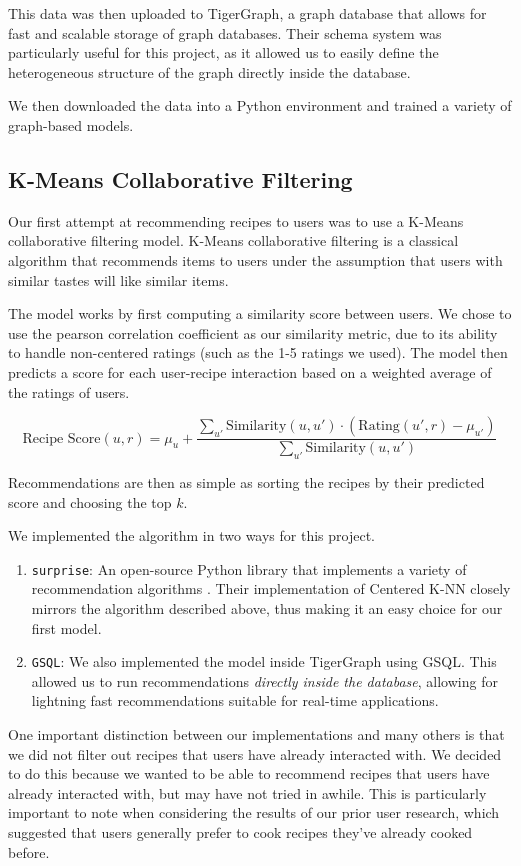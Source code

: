 \documentclass{article}
\begin{document}
This data was then uploaded to TigerGraph, a graph database that allows for fast and scalable storage of graph databases. Their schema system was particularly useful for this project, as it allowed us to easily define the heterogeneous structure of the graph directly inside the database.

We then downloaded the data into a Python environment and trained a variety of graph-based models.

\subsection{K-Means Collaborative Filtering}

Our first attempt at recommending recipes to users was to use a K-Means collaborative filtering model. K-Means collaborative filtering is a classical algorithm that recommends items to users under the assumption that users with similar tastes will like similar items.

The model works by first computing a similarity score between users. We chose to use the pearson correlation coefficient as our similarity metric, due to its ability to handle non-centered ratings (such as the 1-5 ratings we used). The model then predicts a score for each user-recipe interaction based on a weighted average of the ratings of users.

$$
  \text{Recipe Score}(u, r)
  = \mu_{u} + \frac{
    \sum_{u'} \text{Similarity}(u, u')
    \cdot (\text{Rating}(u', r) - \mu_{u'})
  }{
    \sum_{u'} \text{Similarity}(u, u')
  }
$$

Recommendations are then as simple as sorting the recipes by their predicted score and choosing the top $k$.

We implemented the algorithm in two ways for this project.
\begin{enumerate}
  \item \verb|surprise|: An open-source Python library that implements a variety of recommendation algorithms \citep{suprise}. Their implementation of Centered K-NN closely mirrors the algorithm described above, thus making it an easy choice for our first model.
  \item \verb|GSQL|: We also implemented the model inside TigerGraph using GSQL. This allowed us to run recommendations \textit{directly inside the database}, allowing for lightning fast recommendations suitable for real-time applications.
\end{enumerate}

One important distinction between our implementations and many others is that we did not filter out recipes that users have already interacted with. We decided to do this because we wanted to be able to recommend recipes that users have already interacted with, but may have not tried in awhile. This is particularly important to note when considering the results of our prior user research, which suggested that users generally prefer to cook recipes they've already cooked before.
\end{document}
